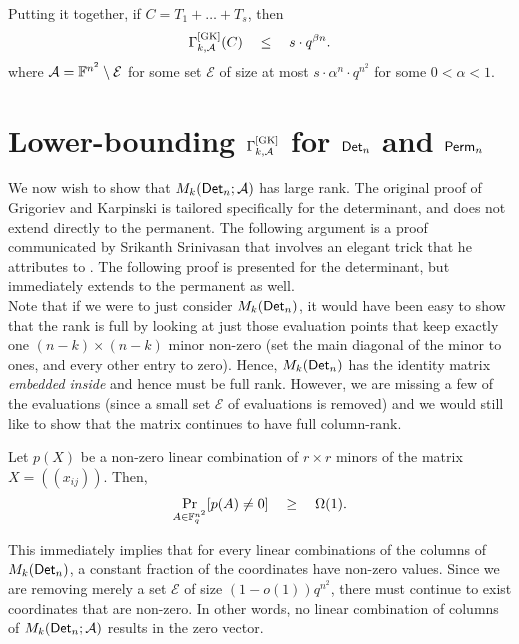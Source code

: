 Putting it together, if $C = T_1 + \dots + T_s$, then 
\begin{equation}\label{eqn:gk-upper-bound-circuit}
\Gamma^{\mathrm{[GK]}}_{k,\mathcal{A}}(C) \quad \leq \quad s \cdot
q^{\beta n}.
\end{equation} 
where $\mathcal{A} = \mathbb{F}^{n^2} \setminus \mathcal{E}$ for some set
$\mathcal{E}$ of size at most $s \cdot \alpha^n \cdot q^{n^2}$ for
some $0< \alpha < 1$.

\section{Lower-bounding $\Gamma^{\mathrm{[GK]}}_{k,\mathcal{A}}$ for $\mathsf{Det}_n$ and $\mathsf{Perm}_n$}

We now wish to show that $M_k(\mathsf{Det}_n;\mathcal{A})$ has large rank. The original proof of Grigoriev and Karpinski is tailored specifically for the determinant, and does not extend directly to the permanent. The following argument is a proof communicated by Srikanth Srinivasan \cite{Srikanth13} that involves an elegant trick that he attributes to \cite{Koutis08}. The following proof is presented for the determinant, but immediately extends to the permanent as well. \\


Note that if we were to just consider $M_k(\mathsf{Det}_n)$, it would have been easy to show that the rank is full by looking at just those evaluation points that keep exactly one $(n-k)\times (n-k)$ minor non-zero (set the main diagonal of the minor to ones, and every other entry to zero). Hence, $M_k(\mathsf{Det}_n)$ has the identity matrix \emph{embedded inside} and hence must be full rank. However, we are missing a few of the evaluations (since a small set $\mathcal{E}$ of evaluations is removed) and we would still like to show that the matrix continues to have full column-rank. 

\begin{lemma}\label{lem:random-lc-det-nonzero}
  Let $p(X)$ be a non-zero linear combination of $r\times r$
  minors of the matrix $X = (\!(x_{ij})\!)$. Then, 
  $$
  \Pr_{A\in \mathbb{F}_q^{n^2}}[p(A) \neq 0] \quad \geq \quad \Omega(1).
  $$
\end{lemma}

This immediately implies that for every linear combinations of the columns of $M_k(\mathsf{Det}_n)$, a constant fraction of the coordinates have non-zero values. Since we are removing merely a set $\mathcal{E}$ of size $(1-o(1))q^{n^2}$, there must continue to exist coordinates that are non-zero. In other words, no linear combination of columns of $M_k(\mathsf{Det}_n;\mathcal{A})$ results in the zero vector. 


